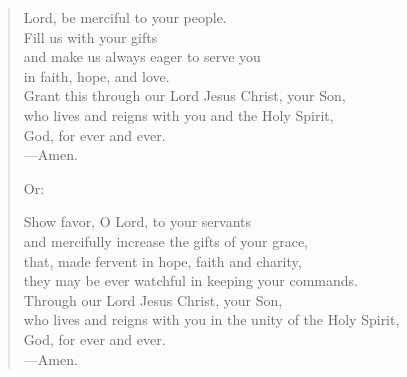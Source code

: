 \prayer

\setlength{\vleftmargin}{\prayerleftmargini}

\begin{verse}
Lord, be merciful to your people.\\
Fill us with your gifts\\
and make us always eager to serve you\\
in faith, hope, and love.\\
Grant this through our Lord Jesus Christ, your Son,\\
who lives and reigns with you and the Holy Spirit,\\
God, for ever and ever.\\
{\color{red}---\thinspace}Amen.

{\color{red}Or:}

Show favor, O Lord, to your servants\\
and mercifully increase the gifts of your grace,\\
that, made fervent in hope, faith and charity,\\
they may be ever watchful in keeping your commands.\\
Through our Lord Jesus Christ, your Son,\\
who lives and reigns with you in the unity of the Holy Spirit,\\
God, for ever and ever.\\
{\color{red}---\thinspace}Amen.
\end{verse}

\setlength{\vleftmargin}{\defleftmargini}